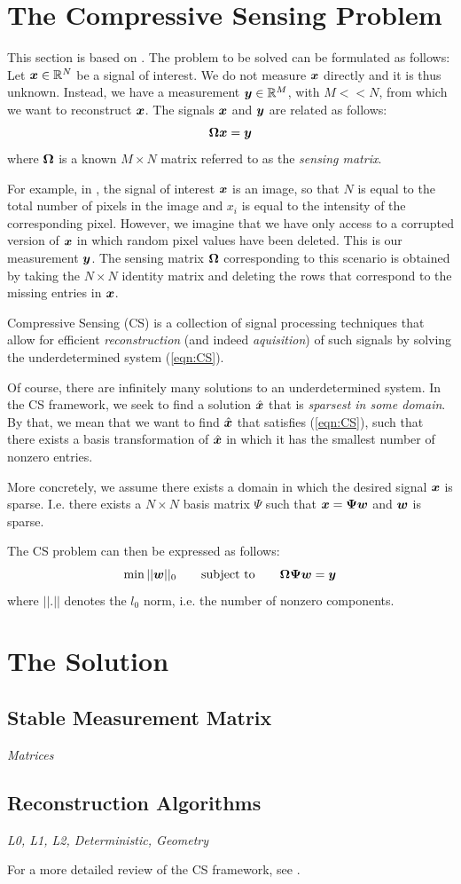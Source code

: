 \section{The Compressive Sensing Problem}



This section is based on \cite{pilikos2014}. 
The problem to be solved can be formulated as follows: Let $\boldsymbol x \in \mathbb{R}^N$ be a signal of interest.
We do not measure $\boldsymbol x$ directly and it is thus unknown.
Instead, we have a measurement $\boldsymbol y \in \mathbb{R}^M$, with $M << N$, from which we want to reconstruct $\boldsymbol x$.
The signals $\boldsymbol x$ and $\boldsymbol y$ are related as follows:
\begin{equation}
\label{eqn:CS}
\boldsymbol \Omega \boldsymbol x = \boldsymbol y
\end{equation}
where $\boldsymbol \Omega$ is a known $M\times N$ matrix referred to as the \emph{sensing matrix}.

For example, in \cite{pilikos2014}, the signal of interest $\boldsymbol x$ is an image, so that $N$ is equal to the total number of pixels in the image and $x_i$ is equal to the intensity of the corresponding pixel.
However, we imagine that we have only access to a corrupted version of $\boldsymbol x$ in which random pixel values have been deleted.
This is our measurement $\boldsymbol y$.
The sensing matrix $\boldsymbol\Omega$ corresponding to this scenario is obtained by taking the $N\times N$ identity matrix and deleting the rows that correspond to the missing entries in $\boldsymbol x$.

Compressive Sensing (CS) is a collection of signal processing techniques that allow for efficient \emph{reconstruction} (and indeed \emph{aquisition}) of such signals by solving the underdetermined system (\ref{eqn:CS}).

Of course, there are infinitely many solutions to an underdetermined system.
In the CS framework, we seek to find a solution $\hat{\boldsymbol x}$ that is \emph{sparsest in some domain}.
By that, we mean that we want to find $\hat{\boldsymbol x}$ that satisfies (\ref{eqn:CS}), such that there exists a basis transformation of $\hat{\boldsymbol x}$ in which it has the smallest number of nonzero entries.

More concretely, we assume there exists a domain in which the desired signal $\boldsymbol x$ is sparse. 
I.e. there exists a $N\times N$ basis matrix $\Psi$ such that $\boldsymbol x = \boldsymbol\Psi \boldsymbol w$ and $\boldsymbol w$ is sparse.

The CS problem can then be expressed as follows:
\begin{equation}
\label{eqn:CSproblem}
\min||\boldsymbol w||_0 \qquad\mbox{subject to}\qquad \boldsymbol\Omega\boldsymbol\Psi\boldsymbol w = \boldsymbol y
\end{equation}
where $||.||$ denotes the $l_0$ norm, i.e. the number of nonzero components.


\section{The Solution}
\subsection{Stable Measurement Matrix}
\emph{Matrices}
\subsection{Reconstruction Algorithms}
\emph{L0, L1, L2, Deterministic, Geometry}

For a more detailed review of the CS framework, see \cite{candes2008}.

